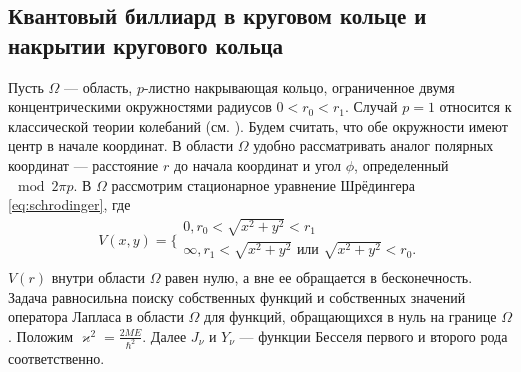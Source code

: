 \subsection{Квантовый биллиард в круговом кольце и накрытии кругового кольца}\label{sec:ch1/sec1/sub4}
Пусть  $\Omega$ --- область, $p$-листно накрывающая кольцо, 
ограниченное двумя концентрическими окружностями радиусов $0 < r_0 < r_1$. Случай $p=1$ относится к классической теории колебаний (см. \cite{wref11}). Будем считать, что обе окружности имеют центр в начале координат.
В  области $\Omega$ удобно рассматривать аналог полярных координат --- расстояние $r$ до начала координат и угол $\phi$, определенный  $\mod 2\pi p$. 
В $\Omega$ рассмотрим стационарное уравнение Шрёдингера \eqref{eq:schrodinger},
где 
\[
    V(x, y) = 
    \Bigg\{
    \begin{array}{cc}
        0, r_0 < \sqrt{x^2+y^2} < r_1 \\
        \infty, r_1 < \sqrt{x^2+y^2} \text{ или } \sqrt{x^2+y^2} < r_0.\\
    \end{array}
\] 
 $V(r)$ внутри области $\Omega$ равен нулю, а вне ее обращается в бесконечность. Задача равносильна поиску собственных функций и собственных значений оператора Лапласа в области $\Omega$ для функций, обращающихся в нуль на границе $\Omega$.
Положим  $\varkappa^2 = \frac{2 M E}{\hbar^2}$. Далее $J_\nu$  и $Y_\nu$ --- функции Бесселя первого и  второго рода соответственно.

